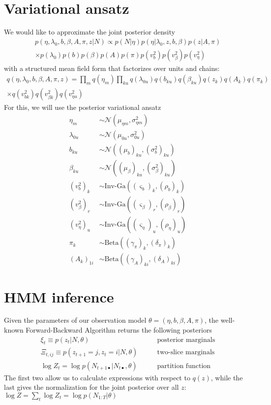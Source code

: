 \documentclass[11pt]{article}
\begin{document}
\section{Variational ansatz}
We would like to approximate the joint posterior density 
\begin{multline}
    p(\eta, \lambda_0, b, \beta, A, \pi, z|N) \propto p(N|\eta) p(\eta|\lambda_0, z, b, \beta) p(z|A, \pi) \\
    \times p(\lambda_0) p(b) p(\beta) p(A) p(\pi) p(v^2_b) p(v^2_\beta) p(v^2_\eta)
\end{multline}
with a structured mean field form that factorizes over units and chains:
\begin{multline}
    q(\eta, \lambda_0, b, \beta, A, \pi, z) = \prod_m q(\eta_m) \prod_{ku} q(\lambda_{0u}) 
    q(b_{ku}) q(\beta_{ku}) q(z_k) q(A_k) q(\pi_k) \\
    \times q(v^2_{bk}) q(v^2_{\beta k}) q(v^2_{\eta u})
\end{multline}
For this, we will use the posterior variational ansatz
\begin{align}
    \eta_m &\sim \mathcal{N}\left(\mu_{\eta m}, \sigma^2_{\eta m}\right) \\
    \lambda_{0u} &\sim \mathcal{N}\left(\mu_{0u}, \sigma^2_{0u}\right) \\
    b_{ku} &\sim \mathcal{N}\left((\mu_b)_{ku}, (\sigma^2_b)_{ku}\right) \\
    \beta_{ku} &\sim \mathcal{N}\left((\mu_\beta)_{ku}, (\sigma^2_\beta)_{ku}\right) \\
    (v^2_b)_{k} &\sim \text{Inv-Ga}\left((\varsigma_b)_{k}, (\rho_b)_{k} \right) \\
    (v^2_\beta)_{r} &\sim \text{Inv-Ga}\left((\varsigma_\beta)_r, (\rho_\beta)_r \right) \\
    (v^2_\eta)_{u} &\sim \text{Inv-Ga}\left((\varsigma_\eta)_u, (\rho_\eta)_u \right) \\
    \pi_k &\sim \mathrm{Beta}\left((\gamma_\pi)_k, (\delta_\pi)_k \right) \\ 
    \left(A_k \right)_{1i} &\sim \mathrm{Beta}\left((\gamma_A)_{ki}, (\delta_A)_{ki} \right)  
\end{align}

\section{HMM inference}
Given the parameters of our observation model $\theta = (\eta, b, \beta, A, \pi)$, the well-known Forward-Backward Algorithm returns the following posteriors
\begin{align}
    \xi_t \equiv p(z_t|N, \theta) &\qquad \text{posterior marginals} \\
    \Xi_{t, ij} \equiv p(z_{t+1} = j, z_t = i|N, \theta) &\qquad \text{two-slice marginals} \\
    \log Z_t = \log p(N_{t+1 \bullet}|N_{t\bullet}, \theta) &\qquad \text{partition function}
\end{align}
The first two allow us to calculate expressions with respect to $q(z)$, while the last gives the normalization for the joint posterior over all $z$: $\log Z = \sum_t \log Z_t = \log p(N_{1:T}|\theta)$
\end{document}
